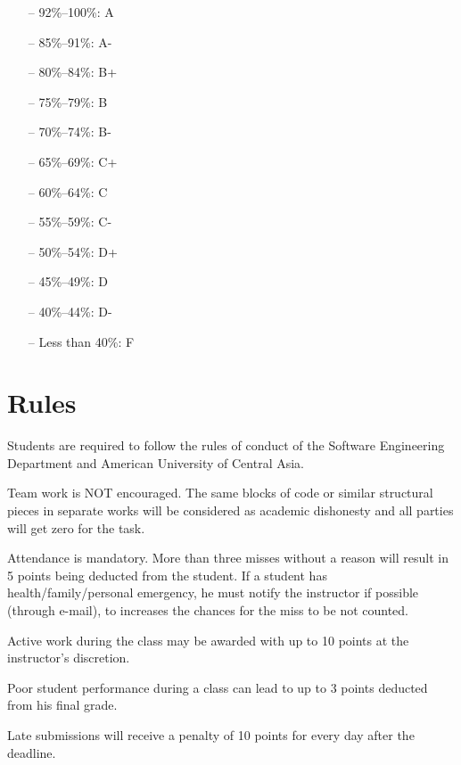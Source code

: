\documentclass[12pt,a4paper,oneside]{article}
\begin{document}
        \begin{itemize} \itemsep-10pt \parskip0pt 
            \item[--] 92\%--100\%: A\\
            \item[--] 85\%--91\%: A-\\
            \item[--] 80\%--84\%: B+\\
            \item[--] 75\%--79\%: B\\
            \item[--] 70\%--74\%: B-\\
            \item[--] 65\%--69\%: C+\\
            \item[--] 60\%--64\%: C\\
            \item[--] 55\%--59\%: C-\\
            \item[--] 50\%--54\%: D+\\
            \item[--] 45\%--49\%: D\\
            \item[--] 40\%--44\%: D-\\
            \item[--] Less than 40\%: F
        \end{itemize}

    \section{Rules}

        Students are required to follow the rules of conduct of the Software
        Engineering Department and American University of Central Asia.

        Team work is NOT encouraged. The same blocks of code or similar
        structural pieces in separate works will be considered as academic
        dishonesty and all parties will get zero for the task.

        Attendance is mandatory. More than three misses without a reason will
        result in 5 points being deducted from the student. If a student has
        health/family/personal emergency, he must notify the instructor if
        possible (through e-mail), to increases the chances for the miss to be
        not counted.

        Active work during the class may be awarded with up to 10 points at the
        instructor's discretion.

        Poor student performance during a class can lead to up to 3 points
        deducted from his final grade.

        Late submissions will receive a penalty of 10 points for every day after
        the deadline.
\end{document}
